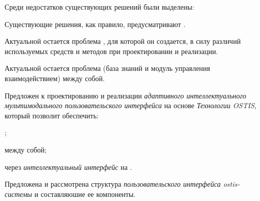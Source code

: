 Среди недостатков существующих решений были выделены:
\begin{textitemize}
	\item Существующие решения, как правило, предусматривают . 
	\item Актуальной остается проблема , для которой он создается, в силу различий используемых средств и методов при проектировании и реализации.
	\item Актуальной остается проблема  (база знаний и модуль управления взаимодействием) между собой.
\end{textitemize}

Предложен  к проектированию и реализации \textit{адаптивного интеллектуального мультимодального пользовательского интерфейса} на основе \textit{Технологии  OSTIS}, который позволит обеспечить:
\begin{textitemize}
	\item {};
	\item {} между собой;
	\item {} через \textit{интеллектуальный интерфейс} на .
\end{textitemize}
Предложена и рассмотрена структура \textit{пользовательского интерфейса ostis-системы} и составляюшие ее компоненты.

%